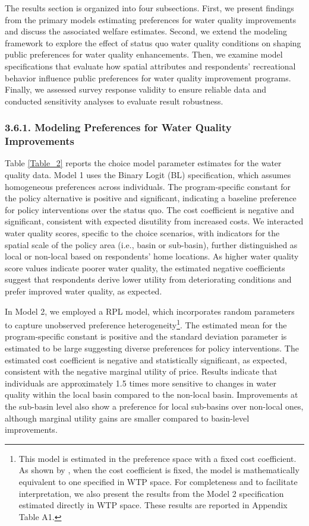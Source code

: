 \documentclass[12pt]{article}
\begin{document}
The results section is organized into four subsections. First, we present findings from the primary models estimating preferences for 
water quality improvements and discuss the associated welfare estimates.  Second, we extend the modeling framework to explore the 
effect of status quo water quality conditions on shaping public preferences for water quality enhancements. Then, we examine model 
specifications that evaluate how spatial attributes and respondents’ recreational behavior influence public preferences for water 
quality improvement programs. Finally, we assessed survey response validity to ensure reliable data and conducted sensitivity analyses to 
evaluate result robustness.

\subsubsection*{3.6.1. Modeling Preferences for Water Quality Improvements}

Table \ref{Table_2} reports the choice model parameter estimates for the water quality data. Model 1 uses the Binary Logit (BL) specification, which assumes homogeneous 
preferences across individuals. The program-specific constant for the policy alternative is positive and significant, indicating 
a baseline preference for policy interventions over the status quo. The cost coefficient is negative and significant, consistent with expected 
disutility from increased costs. We interacted water quality scores, specific to the choice scenarios, with indicators for the 
spatial scale of the policy area (i.e., basin or sub-basin), further distinguished as local or non-local based on respondents’ home 
locations. As higher water quality score values indicate poorer water quality, the estimated negative coefficients suggest that respondents derive 
lower utility from deteriorating conditions and prefer improved water quality, as expected.


In Model 2, we employed a RPL model, which incorporates random parameters to capture unobserved preference heterogeneity\footnote{This model 
is estimated in the preference space with a fixed cost coefficient. As shown by \textcite{train2005discrete}, 
when the cost coefficient is fixed, the model is mathematically equivalent to one specified in WTP space. For completeness and to 
facilitate interpretation, we also present the results from the Model 2 specification estimated directly in WTP space. These 
results are reported in Appendix Table A1.}. The estimated mean for the program-specific constant is positive and the standard 
deviation parameter is estimated to be large suggesting diverse preferences for policy interventions. The estimated cost coefficient 
is negative and statistically significant, as expected, consistent with the negative marginal utility of price. Results indicate 
that individuals are approximately 1.5 times more sensitive to changes in water quality within the local basin compared to the 
non-local basin. Improvements at the sub-basin level also show a preference for local sub-basins over non-local ones, although 
marginal utility gains are smaller compared to basin-level improvements. 
\end{document}
